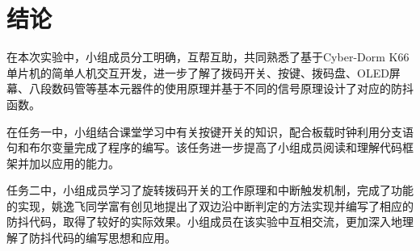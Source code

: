\documentclass[12pt]{article}
\begin{document}
\section{结论}

在本次实验中，小组成员分工明确，互帮互助，共同熟悉了基于Cyber-Dorm K66单片机的简单人机交互开发，进一步了解了拨码开关、按键、拨码盘、OLED屏幕、八段数码管等基本元器件的使用原理并基于不同的信号原理设计了对应的防抖函数。

在任务一中，小组结合课堂学习中有关按键开关的知识，配合板载时钟利用分支语句和布尔变量完成了程序的编写。该任务进一步提高了小组成员阅读和理解代码框架并加以应用的能力。

任务二中，小组成员学习了旋转拨码开关的工作原理和中断触发机制，完成了功能的实现，姚逸飞同学富有创见地提出了双边沿中断判定的方法实现并编写了相应的防抖代码，取得了较好的实际效果。小组成员在该实验中互相交流，更加深入地理解了防抖代码的编写思想和应用。
\end{document}
